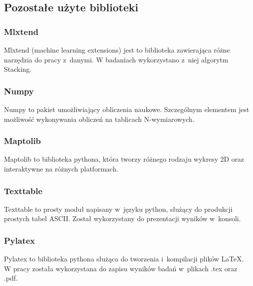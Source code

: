 \subsection{Pozostałe użyte biblioteki}
\subsubsection{Mlxtend}
Mlxtend (machine learning extensions)\cite{mlxtend} jest to biblioteka zawierająca różne narzędzia do pracy z~danymi. W badaniach wykorzystano z~niej algorytm Stacking.
\subsubsection{Numpy}
Numpy to pakiet umożliwiający obliczenia naukowe. Szczególnym elementem jest możliwość wykonywania obliczeń na tablicach N-wymiarowych. 
\subsubsection{Maptolib}
Maptolib to biblioteka pythona, która tworzy różnego rodzaju wykresy 2D oraz interaktywne na różnych platformach.
\subsubsection{Texttable}
Texttable to prosty moduł napisany w~języku python, służący do produkcji prostych tabel ASCII. Został wykorzystany do prezentacji wyników w~konsoli.
\subsubsection{Pylatex}
Pylatex to biblioteka pythona służąca do tworzenia i~kompilacji plików LaTeX. W pracy została wykorzystana do zapisu wyników badań w~plikach .tex oraz .pdf.

